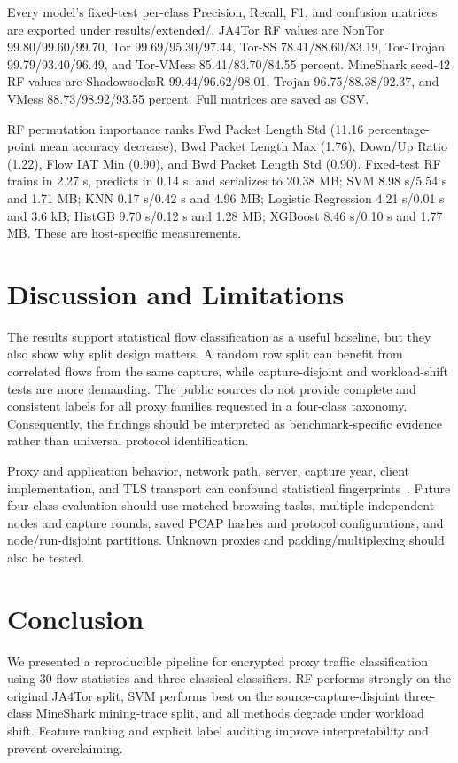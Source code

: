 \documentclass[conference]{IEEEtran}
\begin{document}
Every model's fixed-test per-class Precision, Recall, F1, and confusion matrices are exported under results/extended/. JA4Tor RF values are NonTor 99.80/99.60/99.70, Tor 99.69/95.30/97.44, Tor-SS 78.41/88.60/83.19, Tor-Trojan 99.79/93.40/96.49, and Tor-VMess 85.41/83.70/84.55 percent. MineShark seed-42 RF values are ShadowsocksR 99.44/96.62/98.01, Trojan 96.75/88.38/92.37, and VMess 88.73/98.92/93.55 percent. Full matrices are saved as CSV.

RF permutation importance ranks Fwd Packet Length Std (11.16 percentage-point mean accuracy decrease), Bwd Packet Length Max (1.76), Down/Up Ratio (1.22), Flow IAT Min (0.90), and Bwd Packet Length Std (0.90). Fixed-test RF trains in 2.27 s, predicts in 0.14 s, and serializes to 20.38 MB; SVM 8.98 s/5.54 s and 1.71 MB; KNN 0.17 s/0.42 s and 4.96 MB; Logistic Regression 4.21 s/0.01 s and 3.6 kB; HistGB 9.70 s/0.12 s and 1.28 MB; XGBoost 8.46 s/0.10 s and 1.77 MB. These are host-specific measurements.
\section{Discussion and Limitations}
The results support statistical flow classification as a useful baseline, but they also show why split design matters. A random row split can benefit from correlated flows from the same capture, while capture-disjoint and workload-shift tests are more demanding. The public sources do not provide complete and consistent labels for all proxy families requested in a four-class taxonomy. Consequently, the findings should be interpreted as benchmark-specific evidence rather than universal protocol identification.

Proxy and application behavior, network path, server, capture year, client implementation, and TLS transport can confound statistical fingerprints~\cite{xue}. Future four-class evaluation should use matched browsing tasks, multiple independent nodes and capture rounds, saved PCAP hashes and protocol configurations, and node/run-disjoint partitions. Unknown proxies and padding/multiplexing should also be tested.
\section{Conclusion}
We presented a reproducible pipeline for encrypted proxy traffic classification using 30 flow statistics and three classical classifiers. RF performs strongly on the original JA4Tor split, SVM performs best on the source-capture-disjoint three-class MineShark mining-trace split, and all methods degrade under workload shift. Feature ranking and explicit label auditing improve interpretability and prevent overclaiming.
\end{document}
